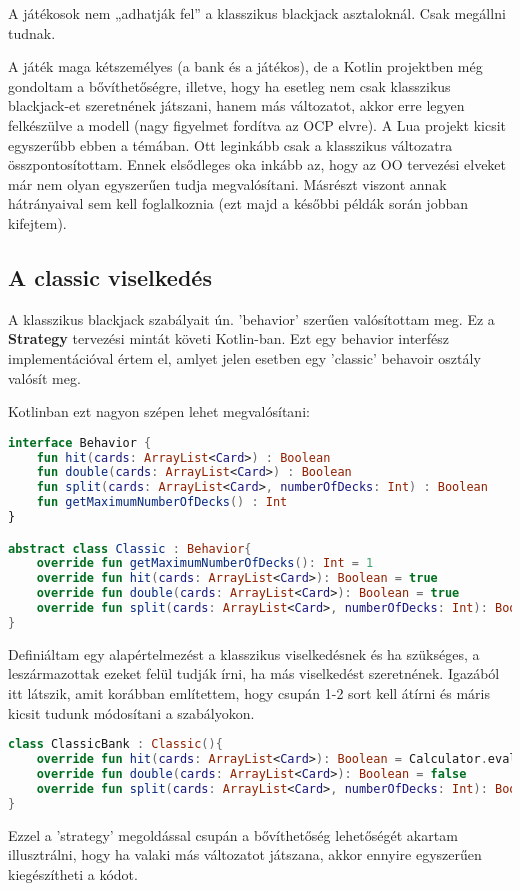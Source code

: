 A játékosok nem „adhatják fel” a klasszikus blackjack asztaloknál. Csak megállni tudnak.

\bigskip

A játék maga kétszemélyes (a bank és a játékos), de a Kotlin projektben még gondoltam a bővíthetőségre, illetve, hogy ha esetleg nem csak klasszikus blackjack-et szeretnének játszani, hanem más változatot, akkor erre legyen felkészülve a modell (nagy figyelmet fordítva az OCP elvre). A Lua projekt kicsit egyszerűbb ebben a témában. Ott leginkább csak a klasszikus változatra összpontosítottam. Ennek elsődleges oka inkább az, hogy az OO tervezési elveket már nem olyan egyszerűen tudja megvalósítani. Másrészt viszont annak hátrányaival sem kell foglalkoznia (ezt majd a későbbi példák során jobban kifejtem). 

\subsection{A classic viselkedés}

A klasszikus blackjack szabályait ún. 'behavior' szerűen valósítottam meg. Ez a \textbf{Strategy} tervezési mintát követi Kotlin-ban. Ezt egy behavior interfész implementációval értem el, amlyet jelen esetben egy 'classic' behavoir osztály valósít meg. 

Kotlinban ezt nagyon szépen lehet megvalósítani:
\scriptsize
\begin{lstlisting}[language = Kotlin]
interface Behavior {
	fun hit(cards: ArrayList<Card>) : Boolean
	fun double(cards: ArrayList<Card>) : Boolean
	fun split(cards: ArrayList<Card>, numberOfDecks: Int) : Boolean
	fun getMaximumNumberOfDecks() : Int
}

abstract class Classic : Behavior{
	override fun getMaximumNumberOfDecks(): Int = 1
	override fun hit(cards: ArrayList<Card>): Boolean = true
	override fun double(cards: ArrayList<Card>): Boolean = true
	override fun split(cards: ArrayList<Card>, numberOfDecks: Int): Boolean = true
}
\end{lstlisting}
\normalsize
Definiáltam egy alapértelmezést a klasszikus viselkedésnek és ha szükséges, a leszármazottak ezeket felül tudják írni, ha más viselkedést szeretnének. Igazából itt látszik, amit korábban említettem, hogy csupán 1-2 sort kell átírni és máris kicsit tudunk módosítani a szabályokon.
\scriptsize
\begin{lstlisting}[language = Kotlin]
class ClassicBank : Classic(){
	override fun hit(cards: ArrayList<Card>): Boolean = Calculator.evaluate(cards) <= 16
	override fun double(cards: ArrayList<Card>): Boolean = false
	override fun split(cards: ArrayList<Card>, numberOfDecks: Int): Boolean = false
}
\end{lstlisting}
\normalsize
Ezzel a 'strategy' megoldással csupán a bővíthetőség lehetőségét akartam illusztrálni, hogy ha valaki más változatot játszana, akkor ennyire egyszerűen kiegészítheti a kódot.

